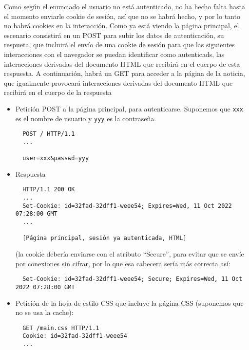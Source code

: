 Como según el enunciado el usuario no está autenticado, no ha hecho falta hasta el momento enviarle cookie de sesión, así que no se habrá hecho, y por lo tanto no habrá cookies en la interacción. Como ya está viendo la página principal, el escenario consistirá en un POST para subir los datos de autenticación, su respueta, que incluirá el envío de una cookie de sesión para que las siguientes interacciones con el navegador se puedan identificar como autenticads, las interacciones derivadas del documento HTML que recibirá en el cuerpo de esta respuesta. A continuación, habrá un GET para acceder a la página de la noticia, que igualmente provocará interacciones derivadas del documento HTML que recibirá en el cuerpo de la respuesta

\begin{itemize}

\item Petición POST a la página principal, para autenticarse. Suponemos que \texttt{xxx} es el nombre de usuario y \texttt{yyy} es la contraseña. 

\begin{verbatim}
  POST / HTTP/1.1
  ...

  user=xxx&passwd=yyy
\end{verbatim}

\item Respuesta

\begin{verbatim}
  HTTP/1.1 200 OK
  ...
  Set-Cookie: id=32fad-32dff1-weee54; Expires=Wed, 11 Oct 2022 07:28:00 GMT
  ...

  [Página principal, sesión ya autenticada, HTML]
\end{verbatim}

  (la cookie debería enviarse con el atributo ``Secure'', para evitar que se envíe por conexiones sin cifrar, por lo que esa cabecera sería más correcta así:

\begin{verbatim}
  Set-Cookie: id=32fad-32dff1-weee54; Secure; Expires=Wed, 11 Oct 2022 07:28:00 GMT
\end{verbatim}
  
\item Petición de la hoja de estilo CSS que incluye la página CSS (suponemos que no se usa la cache):

  \begin{verbatim}
  GET /main.css HTTP/1.1
  Cookie: id=32fad-32dff1-weee54
  ...
\end{verbatim}


\end{itemize}

